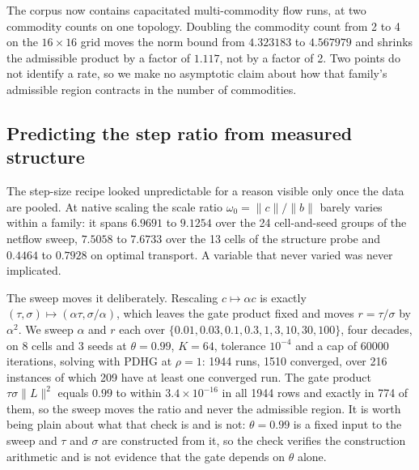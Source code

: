 The corpus now contains capacitated multi-commodity flow runs, at two commodity
counts on one topology. Doubling the commodity count from 2 to 4 on the
$16\times16$ grid moves the norm bound from $4.323183$ to $4.567979$ and
shrinks the admissible product by a factor of $1.117$, not by a factor of 2. Two
points do not identify a rate, so we make no asymptotic claim about how that
family's admissible region contracts in the number of commodities.

\subsection{Predicting the step ratio from measured structure}
\label{sec:exp:omega}

The step-size recipe looked unpredictable for a reason visible only once the
data are pooled. At native scaling the scale ratio $\omega_0 = \|c\| / \|b\|$
barely varies within a family: it spans $6.9691$ to $9.1254$ over the 24
cell-and-seed groups of the netflow sweep, $7.5058$ to $7.6733$ over the 13
cells of the structure probe and $0.4464$ to $0.7928$ on optimal transport. A
variable that never varied was never implicated.

The sweep moves it deliberately. Rescaling $c \mapsto \alpha c$ is exactly
$(\tau, \sigma) \mapsto (\alpha \tau, \sigma / \alpha)$, which leaves the gate
product fixed and moves $r = \tau / \sigma$ by $\alpha^2$. We sweep $\alpha$
and $r$ each over $\{0.01, 0.03, 0.1, 0.3, 1, 3, 10, 30, 100\}$, four decades,
on 8 cells and 3 seeds at $\theta = 0.99$, $K = 64$, tolerance $10^{-4}$ and a
cap of 60000 iterations, solving with PDHG at $\rho = 1$: 1944 runs, 1510
converged, over 216 instances of which 209 have at least one converged run. The
gate product $\tau \sigma \lVert L \rVert^2$ equals $0.99$ to within
$3.4 \times 10^{-16}$ in all 1944 rows and exactly in 774 of them, so the sweep
moves the ratio and never the admissible region. It is worth being plain about
what that check is and is not: $\theta = 0.99$ is a fixed input to the sweep and
$\tau$ and $\sigma$ are constructed from it, so the check verifies the
construction arithmetic and is not evidence that the gate depends on $\theta$
alone.

